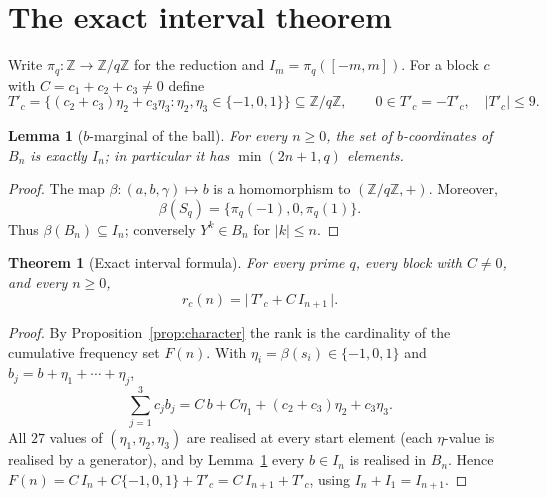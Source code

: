 \documentclass[11pt,a4paper]{article}
\theoremstyle{plain}
\newtheorem{theorem}{Theorem}
\newtheorem{lemma}{Lemma}
\theoremstyle{definition}
\newcommand{\Tp}{T'_c}
\newcommand{\Fq}{\mathbb{Z}/q\mathbb{Z}}
\begin{document}
  \section{The exact interval theorem}
    \label{sec:interval}

    Write $\pi_q:\mathbb{Z}\to\Fq$ for the reduction and $I_m = \pi_q([-m,m])$.
    For a block $c$ with $C = c_1+c_2+c_3 \ne 0$ define
    \begin{equation}
      \Tp = \{(c_2+c_3)\eta_2 + c_3\eta_3 : \eta_2,\eta_3 \in \{-1,0,1\}\}
      \subseteq \Fq,
      \qquad 0 \in \Tp = -\Tp,
      \quad \lvert\Tp\rvert \le 9.
      \label{eq:Tprime}
    \end{equation}

    \begin{lemma}[$b$-marginal of the ball]
      \label{lem:bmarg}
      For every $n \ge 0$, the set of $b$-coordinates of $B_n$ is exactly $I_n$; in particular it
      has $\min(2n+1, q)$ elements.
    \end{lemma}

    \begin{proof}
      The map $\beta:(a,b,\gamma)\mapsto b$ is a homomorphism to $(\Fq,+)$.
      Moreover,
      \[
        \beta(S_q)=\{\pi_q(-1),0,\pi_q(1)\}.
      \]
      Thus $\beta(B_n) \subseteq I_n$; conversely $Y^k \in B_n$ for
      $\lvert k\rvert \le n$.
    \end{proof}

    \begin{theorem}[Exact interval formula]
      \label{thm:interval}
      For every prime $q$, every block with $C \ne 0$, and every $n \ge 0$,
      \begin{equation}
        r_c(n) = \bigl\lvert\, \Tp + C\,I_{n+1} \,\bigr\rvert.
        \label{eq:interval}
      \end{equation}
    \end{theorem}

    \begin{proof}
      By Proposition~\ref{prop:character} the rank is the cardinality of the cumulative frequency
      set $F(n)$.
      With $\eta_i = \beta(s_i) \in \{-1,0,1\}$ and $b_j = b + \eta_1 + \cdots + \eta_j$,
      \begin{equation}
        \textstyle\sum_{j=1}^{3} c_j b_j
        = C\,b + C\eta_1 + (c_2+c_3)\eta_2 + c_3\eta_3 .
        \label{eq:frequency}
      \end{equation}
      All $27$ values of $(\eta_1,\eta_2,\eta_3)$ are realised at every start element (each
      $\eta$-value is realised by a generator), and by Lemma~\ref{lem:bmarg} every $b \in I_n$ is
      realised in $B_n$.
      Hence $F(n) = C\,I_n + C\{-1,0,1\} + \Tp = C\,I_{n+1} + \Tp$, using
      $I_n + I_1 = I_{n+1}$.
    \end{proof}
\end{document}
